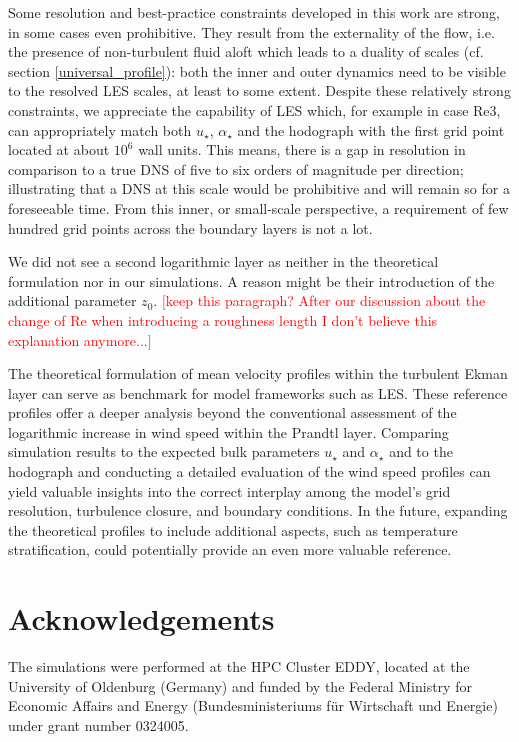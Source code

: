\documentclass[draft,a4paper,11pt]{article}
\newcommand{\todo}[1]{\textcolor{red}{$[$#1$]$}}
\begin{document}
Some resolution and best-practice constraints developed in this work are strong, in some cases even prohibitive. They result from the externality of the flow, i.e. the presence of non-turbulent fluid aloft which leads to a duality of scales (cf. section \ref{universal_profile}): both the inner and outer dynamics need to be visible to the resolved LES scales, at least to some extent. Despite these relatively strong constraints, we appreciate the capability of LES which, for example in case Re3, can appropriately match both $u_\star$, $\alpha_\star$ and the hodograph with the first grid point located at about $10^6$ wall units. This means, there is a gap in resolution in comparison to a true DNS of five to six orders of magnitude per direction; illustrating that a DNS at this scale would be prohibitive and will remain so for a foreseeable time. From this inner, or small-scale perspective, a requirement of few hundred grid points across the boundary layers is not a lot.

We did not see a second logarithmic layer as \cite{jiang2018large} neither in the theoretical formulation nor in our simulations. A reason might be their introduction of the additional parameter $z_0$. \todo{keep this paragraph? After our discussion about the change of Re when introducing a roughness length I don't believe this explanation anymore...}

The theoretical formulation of mean velocity profiles within the turbulent Ekman layer can serve as benchmark for model frameworks such as LES. These reference profiles offer a deeper analysis beyond the conventional assessment of the logarithmic increase in wind speed within the Prandtl layer. Comparing simulation results to the expected bulk parameters $u_\star$ and $\alpha_\star$ and to the hodograph and conducting a detailed evaluation of the wind speed profiles can yield valuable insights into the correct interplay among the model's grid resolution, turbulence closure, and boundary conditions. In the future, expanding the theoretical profiles to include additional aspects, such as temperature stratification, could potentially provide an even more valuable reference.

\section{Acknowledgements}

The simulations were performed at the HPC Cluster EDDY, located at the University of Oldenburg (Germany) and funded by the Federal Ministry for Economic Affairs and Energy (Bundesministeriums für Wirtschaft und Energie) under grant number 0324005.



\end{document}
